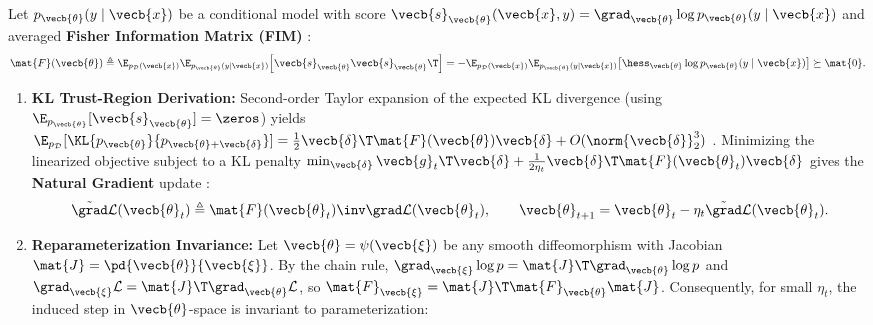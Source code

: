 \documentclass[../../../../master.tex]{subfiles}
\begin{document}
\begin{coremath}
\label{thm:optalg:ngd_kfac}
Let $p_{\vecb{\theta}}(y\mid\vecb{x})$ be a conditional model with score $\vecb{s}_{\vecb{\theta}}(\vecb{x},y) = \grad_{\vecb{\theta}}\log p_{\vecb{\theta}}(y\mid\vecb{x})$ and averaged \textbf{Fisher Information Matrix (FIM)} :
\begin{equation}
\label{eq:optalg:fim}
  \mat{F}(\vecb{\theta}) \triangleq \E_{p_{\mathcal{D}}(\vecb{x})}\E_{p_{\vecb{\theta}}(y\mid\vecb{x})}\!\left[\vecb{s}_{\vecb{\theta}}\vecb{s}_{\vecb{\theta}}\T\right]
  = -\E_{p_{\mathcal{D}}(\vecb{x})}\E_{p_{\vecb{\theta}}(y\mid\vecb{x})}\!\left[\hess_{\vecb{\theta}}\log p_{\vecb{\theta}}(y\mid\vecb{x})\right] \succeq \mat{0}.
\end{equation}
\begin{enumerate}
  \item \textbf{KL Trust-Region Derivation:} Second-order Taylor expansion of the expected KL divergence (using $\E_{p_{\vecb{\theta}}}[\vecb{s}_{\vecb{\theta}}] = \zeros$) yields $\E_{p_{\mathcal{D}}}[\KL{p_{\vecb{\theta}}}{p_{\vecb{\theta}+\vecb{\delta}}}] = \frac{1}{2}\vecb{\delta}\T \mat{F}(\vecb{\theta})\vecb{\delta} + O(\norm{\vecb{\delta}}_2^3)$ . Minimizing the linearized objective subject to a KL penalty $\min_{\vecb{\delta}} \vecb{g}_t\T\vecb{\delta} + \frac{1}{2\eta_t}\vecb{\delta}\T\mat{F}(\vecb{\theta}_t)\vecb{\delta}$ gives the \textbf{Natural Gradient} update :
  \begin{equation}
  \label{eq:optalg:ngd}
    \tilde{\grad}\mathcal{L}(\vecb{\theta}_t) \triangleq \mat{F}(\vecb{\theta}_t)\inv \grad\mathcal{L}(\vecb{\theta}_t), \qquad \vecb{\theta}_{t+1} = \vecb{\theta}_t - \eta_t \tilde{\grad}\mathcal{L}(\vecb{\theta}_t).
  \end{equation}
  \item \textbf{Reparameterization Invariance:} Let $\vecb{\theta} = \psi(\vecb{\xi})$ be any smooth diffeomorphism with Jacobian $\mat{J} = \pd{\vecb{\theta}}{\vecb{\xi}}$. By the chain rule, $\grad_{\vecb{\xi}}\log p = \mat{J}\T\grad_{\vecb{\theta}}\log p$ and $\grad_{\vecb{\xi}}\mathcal{L} = \mat{J}\T\grad_{\vecb{\theta}}\mathcal{L}$, so $\mat{F}_{\vecb{\xi}} = \mat{J}\T\mat{F}_{\vecb{\theta}}\mat{J}$. Consequently, for small $\eta_t$, the induced step in $\vecb{\theta}$-space is invariant to parameterization:

\end{enumerate}
\end{coremath}
\end{document}
